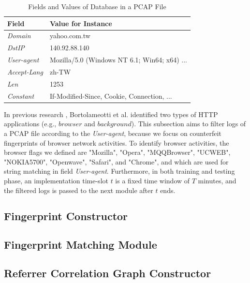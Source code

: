 \begin{table}[]
\centering
\caption{Fields and Values of Database in a PCAP File}
\label{tbl:log_01}
\begin{tabular}{ll}
\hline\hline
Field                           & Value for Instance                                               \\\hline
{\em Domain}            & yahoo.com.tw                                                      \\
{\em DstIP}                & 140.92.88.140                                                     \\
{\em User-agent}      & Mozilla/5.0 (Windows NT 6.1; Win64; x64) ...  \\
{\em Accept-Lang}   & zh-TW                                                                  \\
{\em Len}                   & 1253                                                                     \\
{\em Constant}          & If-Modified-Since, Cookie, Connection, ...       \\\hline\hline
\end{tabular}
\end{table}

In previous research \cite{bortolameotti2017decanter}, Bortolameotti et al. identified two types of HTTP applications (e.g., $browser$ and $background$). This subsection aims to filter logs of a PCAP file according to the {\em User-agent}, because we focus on counterfeit fingerprints of browser network activities. To identify browser activities, the browser flags we defined are "Mozilla", "Opera", "MQQBrowser", "UCWEB",  "NOKIA5700", "Openwave", "Safari", and "Chrome", and which are used for string matching in field {\em User-agent}. Furthermore, in both training and testing phase, an implementation time-slot $t$ is a fixed time window of $T$ minutes, and the filtered logs is passed to the next module after $t$ ends.

\subsection{Fingerprint Constructor}

\subsection{Fingerprint Matching Module}

\subsection{Referrer Correlation Graph Constructor}

